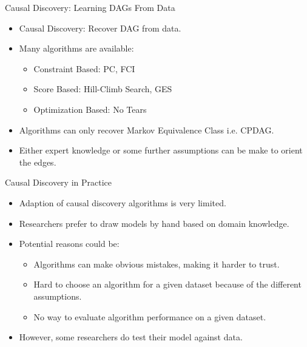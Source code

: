 \documentclass{beamer}
\begin{document}
\begin{frame}{Causal Discovery: Learning DAGs From Data}
	\begin{itemize}
		\item Causal Discovery: Recover DAG from data.
		\item Many algorithms are available:
			\begin{itemize}
				\item Constraint Based: PC, FCI
				\item Score Based: Hill-Climb Search, GES
				\item Optimization Based: No Tears
			\end{itemize}
		\item Algorithms can only recover Markov Equivalence Class i.e. CPDAG.
		\item Either expert knowledge or some further assumptions can
			be make to orient the edges.
	\end{itemize}
\end{frame}

\begin{frame}{Causal Discovery in Practice}
	\begin{itemize}
		\item Adaption of causal discovery algorithms is very limited.
		\item Researchers prefer to draw models by hand based on domain knowledge.
		\item Potential reasons could be:
			\begin{itemize}
				\item Algorithms can make obvious mistakes, making it harder to trust.
				\item Hard to choose an algorithm for a given dataset because of the different assumptions.
				\item No way to evaluate algorithm performance on a given dataset.
			\end{itemize}
		\item However, some researchers do test their model against data.
	\end{itemize}
\end{frame}
\end{document}
